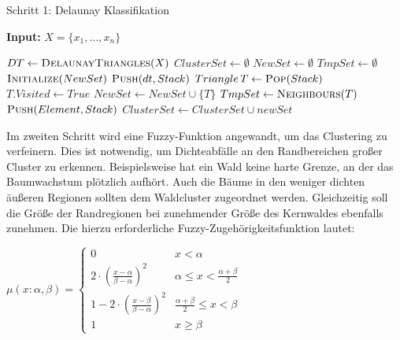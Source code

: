 \documentclass[11pt,ceqn]{book}
\begin{document}
\vfill
\hspace{0pt}
\pagebreak


\begin{algorithm}[H]
\caption{ Schritt 1: Delaunay Klassifikation}\label{nsfcdt}
\hspace*{\algorithmicindent} \textbf{Input:} $X=\{x_1,\dots,x_n\}$ 
\begin{algorithmic}[1]
\State $DT \gets \textsc{Delaunay}\textsc{Triangles}(X)$
\State $ClusterSet \gets \emptyset$
\State $NewSet \gets \emptyset$
\State $TmpSet \gets \emptyset$
\State $\textsc{Initialize}(NewSet)$
\State $\textsc{Push}(dt,Stack)$
\State $Triangle\,T \gets \textsc{Pop}(Stack)$
\State $T.Visited \gets True$
\State $NewSet \gets NewSet \cup \{T\}$
\State $TmpSet \gets \textsc{Neighbours}(T)$
\State $\textsc{Push}(Element,Stack)$
\EndIf
\EndFor
\EndIf
\EndWhile
\State $ClusterSet \gets ClusterSet \cup newSet$
\EndIf
\EndFor
\end{algorithmic}
\end{algorithm}

Im zweiten Schritt wird eine Fuzzy-Funktion angewandt, um das Clustering zu verfeinern. Dies ist notwendig, um Dichteabfälle an den Randbereichen großer Cluster zu erkennen. Beispielsweise hat ein Wald keine harte Grenze, an der das Baumwachstum plötzlich aufhört. Auch die Bäume in den weniger dichten äußeren Regionen sollten dem Waldcluster zugeordnet werden. Gleichzeitig soll die Größe der Randregionen bei zunehmender Größe des Kernwaldes ebenfalls zunehmen. Die hierzu erforderliche Fuzzy-Zugehörigkeitsfunktion lautet:

$\mu(x:\alpha,\beta) = \left\{
\begin{array}{ll}
0 & x < \alpha \\
2\cdot\left(\frac{x-\alpha}{\beta-\alpha}\right)^2 & \alpha \leqslant x < \frac{\alpha + \beta}{2} \\
1-2\cdot\left(\frac{x-\beta}{\beta-\alpha}\right)^2 & \frac{\alpha + \beta}{2} \leqslant x < \beta \\
1 & x \geqslant \beta
\end{array}
\right. $
\end{document}
